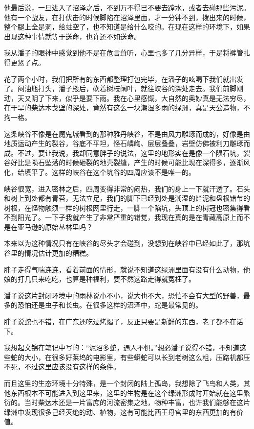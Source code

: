 他最后说，一旦进入了沼泽之后，不到万不得已不要去蹚水，或者去碰那些污泥。他有一个战友，在打伏击的时候脚陷在沼泽里面，才一分钟不到，拨出来的时候，整个腿上全是洞，给蛀空了，也不知道是给什么咬的。在现在这样的环境下，如果出现这种事情就等于送命，也许还不如送命。

我从潘子的眼神中感觉到他不是在危言耸听，心里也多了几分异样，于是将裤管扎得更紧了点。

花了两个小时，我们把所有的东西都整理打包完毕，在潘子的吆喝下我们就出发了。闷油瓶打头，潘子殿后，砍着树枝阔叶，就往峡谷的深处走去。我们前脚刚动，天又阴了下来，似乎是要下雨。我在心里感慨，大自然的奥妙真是无法穷尽，在干旱的柴达木戈壁的深处，竟然有这么一块潮湿多雨的绿洲，真是天公造物，不拘一格。

这条峡谷不像是在魔鬼城看到的那种雅丹峡谷，不是由风力雕琢而成的，好像是由地质运动产生的裂谷，谷底不平坦，怪石嶙峋、层层叠叠，岩壁仿佛被利刀雕琢而成。不过，要让我说，我却同意胖子的说法，这里的地形实在是像一个陨石坑，裂谷好比是陨石坠落的时候砸裂的地壳裂缝，产生的时候可能比现在深得多，逐渐风化，给填平了。这样的峡谷在这个坑谷的四周应该不是唯一的。

峡谷很宽，进入密林之后，四周变得非常的闷热，我们的身上一下就汗透了。石头和树上到处都有青苔，无法立足，我们的脚下已经到处是潮湿的烂泥和盘根错节的树根，在怪物触须一样的树根网里行走，一脚一个陷坑，头顶上的树冠也密集得看不到阳光了。一下子我就产生了非常严重的错觉，我现在真的是在青藏高原上而不是在亚马逊的原始丛林里吗？

本来以为这种情况只有在峡谷的尽头才会碰到，没想到在峡谷中已经如此了，那坑谷里的情况估计更加的糟糕。

胖子走得气喘连连，看着前面的情形，就说不知道这绿洲里面有没有什么动物，他娘的打几只来吃吃，也算是种福利，要不然这路走得就冤枉了。

潘子说这片封闭环境中的雨林说小不小，说大也不大，恐怕不会有大型的野兽，最多的恐怕还是虫子和长虫。在很多这样的沼泽中，蛇是最常见的。

胖子说蛇也不错，在广东还吃过烤蝎子，反正只要是新鲜的东西，老子都不在话下。

我想起文锦在笔记中写的：“泥沼多蛇，遇人不惧。”想必潘子说得不错，不知道这些蛇的大小，在很多好莱坞的电影里，有些蟒蛇可以长到老树这么粗，压路机都压不死，不过这里应该没有这样的条件。

而且这里的生态环境十分特殊，是一个封闭的陆上孤岛，我想除了飞鸟和人类，其他东西根本不可能进入到这里来，这里的生物是在这个绿洲形成时开始就在这里繁衍的。当时柴达木还是一片富庶的河流密集之地，物种丰富，也许我们能够在这片绿洲中发现很多己经灭绝的动、植物，这有可能比西王母宫里的东西更加的有价值。

